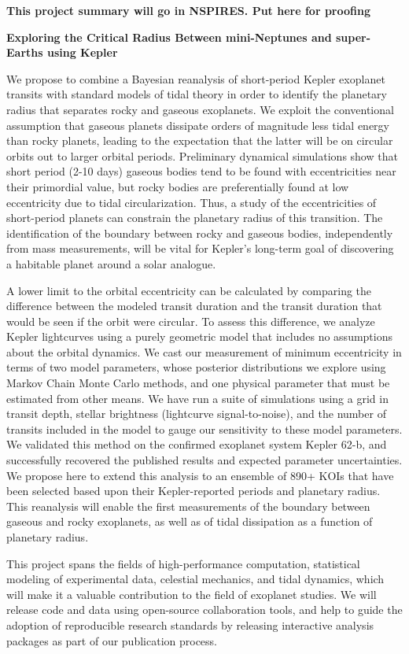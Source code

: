 \centerline{\bf This project summary will go in NSPIRES.  Put here for proofing} \medskip

\centerline{\bf Exploring the Critical Radius Between mini-Neptunes and super-Earths using Kepler} \medskip

We propose to combine a Bayesian reanalysis of short-period Kepler
exoplanet transits with standard models of tidal theory in order to
identify the planetary radius that separates rocky and gaseous
exoplanets. We exploit the conventional assumption that gaseous
planets dissipate orders of magnitude less tidal energy than rocky
planets, leading to the expectation that the latter will be on
circular orbits out to larger orbital periods. Preliminary dynamical
simulations show that short period (2-10 days) gaseous bodies tend to
be found with eccentricities near their primordial value, but rocky
bodies are preferentially found at low eccentricity due to tidal
circularization.  Thus, a study of the eccentricities of short-period
planets can constrain the planetary radius of this transition.  The
identification of the boundary between rocky and gaseous bodies,
independently from mass measurements, will be vital for Kepler's
long-term goal of discovering a habitable planet around a solar
analogue.

A lower limit to the orbital eccentricity can be calculated by
comparing the difference between the modeled transit duration and the
transit duration that would be seen if the orbit were circular.  To
assess this difference, we analyze Kepler lightcurves using a purely
geometric model that includes no assumptions about the orbital
dynamics.  We cast our measurement of minimum eccentricity in terms of
two model parameters, whose posterior distributions we explore using
Markov Chain Monte Carlo methods, and one physical parameter that must
be estimated from other means.  We have run a suite of simulations
using a grid in transit depth, stellar brightness (lightcurve
signal-to-noise), and the number of transits included in the model to
gauge our sensitivity to these model parameters.
%
%
We validated this method on the confirmed exoplanet system Kepler
62-b, and successfully recovered the published results and expected
parameter uncertainties. We propose here to extend this analysis to an
ensemble of 890+ KOIs that have been selected based upon their
Kepler-reported periods and planetary radius.  This reanalysis will
enable the first measurements of the boundary between gaseous and
rocky exoplanets, as well as of tidal dissipation as a function of
planetary radius.

This project spans the fields of high-performance computation,
statistical modeling of experimental data, celestial mechanics, and
tidal dynamics, which will make it a valuable contribution to the
field of exoplanet studies.  We will release code and data using
open-source collaboration tools, and help to guide the adoption of
reproducible research standards by releasing interactive analysis
packages as part of our publication process.

